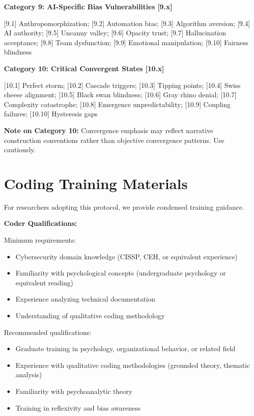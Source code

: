\documentclass[11pt,a4paper]{article}
\begin{document}
\textbf{Category 9: AI-Specific Bias Vulnerabilities [9.x]}

[9.1] Anthropomorphization; [9.2] Automation bias; [9.3] Algorithm aversion; [9.4] AI authority; [9.5] Uncanny valley; [9.6] Opacity trust; [9.7] Hallucination acceptance; [9.8] Team dysfunction; [9.9] Emotional manipulation; [9.10] Fairness blindness

\textbf{Category 10: Critical Convergent States [10.x]}

[10.1] Perfect storm; [10.2] Cascade triggers; [10.3] Tipping points; [10.4] Swiss cheese alignment; [10.5] Black swan blindness; [10.6] Gray rhino denial; [10.7] Complexity catastrophe; [10.8] Emergence unpredictability; [10.9] Coupling failures; [10.10] Hysteresis gaps

\textbf{Note on Category 10:} Convergence emphasis may reflect narrative construction conventions rather than objective convergence patterns. Use cautiously.

\section{Coding Training Materials}
\label{app:training}

For researchers adopting this protocol, we provide condensed training guidance.

\textbf{Coder Qualifications:}

Minimum requirements:
\begin{itemize}
\item Cybersecurity domain knowledge (CISSP, CEH, or equivalent experience)
\item Familiarity with psychological concepts (undergraduate psychology or equivalent reading)
\item Experience analyzing technical documentation
\item Understanding of qualitative coding methodology
\end{itemize}

Recommended qualifications:
\begin{itemize}
\item Graduate training in psychology, organizational behavior, or related field
\item Experience with qualitative coding methodologies (grounded theory, thematic analysis)
\item Familiarity with psychoanalytic theory
\item Training in reflexivity and bias awareness
\end{itemize}
\end{document}
